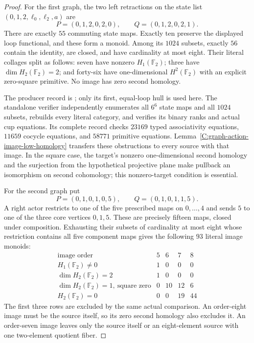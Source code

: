 \begin{proof}
For the first graph, the two left retractions on the state list
$(0,1,2,\ell_0,\ell_2,a)$ are
\[
 P=(0,1,2,0,2,0),\qquad Q=(0,1,2,0,2,1).
\]
There are exactly $55$ commuting state maps.  Exactly ten preserve
the displayed loop functional, and these form a monoid.  Among its
$1024$ subsets, exactly $56$ contain the identity, are closed, and
have cardinality at most eight.  Their literal collages split as
follows: seven have nonzero $H_1(\mathbb F_2)$; three have
$\dim H_2(\mathbb F_2)=2$; and forty-six have one-dimensional
$H^2(\mathbb F_2)$ with an explicit zero-square primitive.
No image has zero second homology.

The producer record is
; only
its first, equal-loop hull is used here.  The standalone verifier
 independently
enumerates all $6^6$ state maps and all $1024$ subsets, rebuilds
every literal category, and verifies its binary ranks and actual
cup equations.  Its complete record
checks $23169$ typed associativity equations, $11659$ cocycle
equations, and $58771$ primitive equations.
Lemma~\ref{C:graph-action-image-low-homology} transfers these
obstructions to every source with that image.  In the square case,
the target's nonzero one-dimensional second homology and the
surjection from the hypothetical projective plane make pullback
an isomorphism on second cohomology; this nonzero-target condition
is essential.

For the second graph put
\[
 P=(0,1,0,1,0,5),\qquad Q=(0,1,0,1,1,5).
\]
A right actor restricts to one of the five prescribed maps on
$0,\ldots,4$ and sends $5$ to one of the three core vertices
$0,1,5$.  These are precisely fifteen maps, closed under
composition.  Exhausting their subsets of cardinality at most
eight whose restriction contains all five component maps gives
the following $93$ literal image monoids:
\[
\begin{array}{c|rrrr}
\text{image order}&5&6&7&8\\\hline
H_1(\mathbb F_2)\ne0&1&0&0&0\\
\dim H_2(\mathbb F_2)=2&1&0&0&0\\
\dim H_2(\mathbb F_2)=1,\ \text{square zero}&0&10&12&6\\
H_2(\mathbb F_2)=0&0&0&19&44
\end{array}
\]
The first three rows are excluded by the same actual comparison.
An order-eight image must be the source itself, so its zero
second homology also excludes it.  An order-seven image leaves
only the source itself or an eight-element source with one
two-element quotient fiber.


\end{proof}
